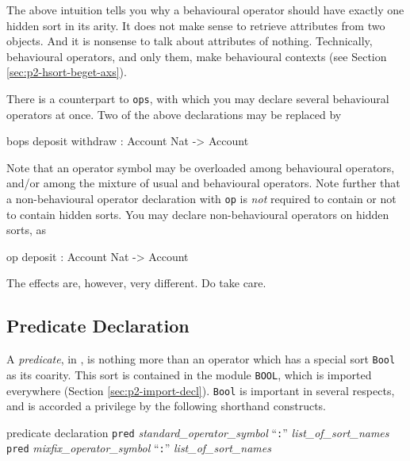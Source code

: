\documentclass[a4paper]{memoir}
\begin{document}
The above intuition tells you why a behavioural operator should have
exactly one hidden sort in its arity. It does not make sense to
retrieve attributes from two objects. And it is nonsense to talk about
attributes of nothing. Technically, behavioural operators, and only them,
make behavioural contexts (see Section \ref{sec:p2-hsort-beget-axs}).

There is a counterpart to \verb|ops|, with which you may
declare several behavioural operators at once.
Two of the above declarations may be
replaced by
\begin{vvtm}
\begin{ccode}
  bops deposit withdraw : Account Nat -> Account
\end{ccode}
\end{vvtm}
Note that an operator symbol may be overloaded among behavioural operators,
and/or among the mixture of usual and behavioural operators. Note
further that a non-behavioural operator declaration with
\verb|op| is {\em not} required to contain or not to contain
hidden sorts. You may declare non-behavioural operators on hidden sorts, as
\begin{vvtm}
\begin{ccode}
  op deposit : Account Nat -> Account
\end{ccode}
\end{vvtm}
The effects are, however, very different. Do take care.

\subsection{Predicate Declaration}\label{sec:p2-pred-decl}

A {\em predicate}, in \cafeobj, is nothing more
than an operator which has a special sort \verb|Bool| as its coarity.
This sort is contained in the module \verb|BOOL|, which is imported
everywhere (Section \ref{sec:p2-import-decl}).
\verb|Bool| is important in several respects, and is accorded a privilege
by the following shorthand constructs.

\begin{bsyntax} predicate declaration  \Hline
\texttt{pred} \textit{standard\_operator\_symbol} ``\texttt{:}'' \textit{list\_of\_sort\_names}
\texttt{pred} \textit{mixfix\_operator\_symbol} ``\texttt{:}'' \textit{list\_of\_sort\_names}
\end{bsyntax}
\end{document}
